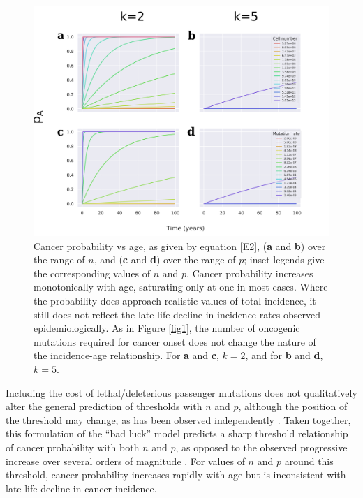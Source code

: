 \documentclass[12pt,onecolumn,twoside]{article}
\begin{document}
\begin{figure}[!ht]
	\begin{minipage}[c]{0.6\textwidth}
		\includegraphics[width=\linewidth, keepaspectratio=true]{fig2.png}
	\end{minipage}
	\begin{minipage}[c]{0.4\textwidth}
		\caption{Cancer probability vs age, as given by equation \ref{E2}, (\textbf{a} and \textbf{b}) over the range of $n$, and (\textbf{c} and \textbf{d}) over the range of $p$; inset legends give the corresponding values of $n$ and $p$. Cancer probability increases monotonically with age, saturating only at one in most cases. Where the probability does approach realistic values of total incidence, it still does not reflect the late-life decline in incidence rates observed epidemiologically. As in Figure \ref{fig1}, the number of oncogenic mutations required for cancer onset does not change the nature of the incidence-age relationship. For \textbf{a} and \textbf{c}, $k=2$, and for \textbf{b} and \textbf{d}, $k=5$.}
		\label{fig2}
	\end{minipage} 
\end{figure}

Including the cost of lethal/deleterious passenger mutations does not qualitatively alter the general prediction of thresholds with $n$ and $p$, although the position of the threshold may change, as has been observed independently \autocite{McFarland2013}. Taken together, this formulation of the ``bad luck'' model predicts a sharp threshold relationship of cancer probability with both $n$ and $p$, as opposed to the observed progressive increase over several orders of magnitude \autocite{Tomasetti78, Tomasetti2017}. For values of $n$ and $p$ around this threshold, cancer probability increases rapidly with age but is inconsistent with late-life decline in cancer incidence.
\end{document}
